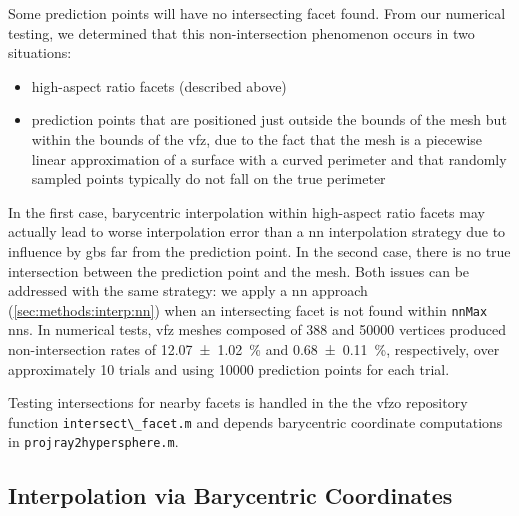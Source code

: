 \documentclass[final,twocolumn,12pt]{elsarticle}
\newcommand{\matlab}[1]{\mbox{\lstinline[style=Matlab-editor]{#1}}}
\newcommand{\outpt}{prediction}
\newcommand{\vfzorepo}{\gls{vfzo} repository}
\begin{document}
\begin{appendices}
Some \outpt{} points will have no intersecting facet found.
From our numerical testing, we determined that this non-intersection phenomenon occurs in two situations:
\begin{itemize}
    \item high-aspect ratio facets (described above)
    \item \outpt{} points that are positioned just outside the bounds of the mesh but within the bounds of the \gls{vfz}, due to the fact that the mesh is a piecewise linear approximation of a surface with a curved perimeter and that randomly sampled points typically do not fall on the true perimeter
\end{itemize}
In the first case, barycentric interpolation within high-aspect ratio facets may actually lead to worse interpolation error than a \gls{nn} interpolation strategy due to influence by \glspl{gb} far from the \outpt{} point. In the second case, there is no true intersection between the \outpt{} point and the mesh. Both issues can be addressed with the same strategy: we apply a \gls{nn} approach (\cref{sec:methods:interp:nn}) when an intersecting facet is not found within \matlab{nnMax} \glspl{nn}. In numerical tests, \gls{vfz} meshes composed of \num{388} and \num{50000} vertices produced non-intersection rates of \SI{12.07 \pm 1.02}{\percent} and \SI{0.68 \pm 0.11}{\percent}, respectively, over approximately \num{10} trials and using \num{10000} \outpt{} points for each trial.

Testing intersections for nearby facets is handled in the the \vfzorepo{} function \matlab{intersect\_facet.m} and depends barycentric coordinate computations in \matlab{projray2hypersphere.m}.

\subsection{Interpolation via Barycentric Coordinates}
\label{sec:app:bary-interp}


\end{appendices}
\end{document}
